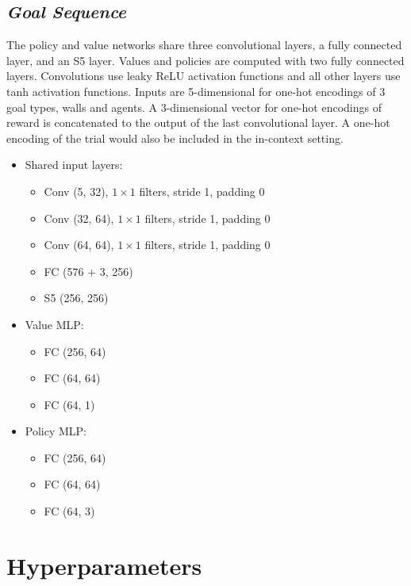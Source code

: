 \documentclass{article}
\begin{document}
\subsection{\textit{Goal Sequence}}
The policy and value networks share three convolutional layers, a fully connected layer, and an S5 layer. Values and policies are computed with two fully connected layers. Convolutions use leaky ReLU activation functions and all other layers use tanh activation functions. Inputs are 5-dimensional for one-hot encodings of 3 goal types, walls and agents. A 3-dimensional vector for one-hot encodings of reward is concatenated to the output of the last convolutional layer. A one-hot encoding of the trial would also be included in the in-context setting.
\begin{itemize}
\item{Shared input layers:}
\begin{itemize}
\item{Conv (5, 32), $1 \times 1$ filters, stride 1, padding 0}
\item{Conv (32, 64), $1 \times 1$ filters, stride 1, padding 0}
\item{Conv (64, 64), $1 \times 1$ filters, stride 1, padding 0}
\item{FC (576 + 3, 256)}
\item{S5 (256, 256)}
\end{itemize}
\item{Value MLP:}
\begin{itemize}
\item{FC (256, 64)}
\item{FC (64, 64)}
\item{FC (64, 1)}
\end{itemize}
\item{Policy MLP:}
\begin{itemize}
\item{FC (256, 64)}
\item{FC (64, 64)}
\item{FC (64, 3)}
\end{itemize}
\end{itemize}
\newpage
\section{Hyperparameters}
\label{A:hparams}
\end{document}
